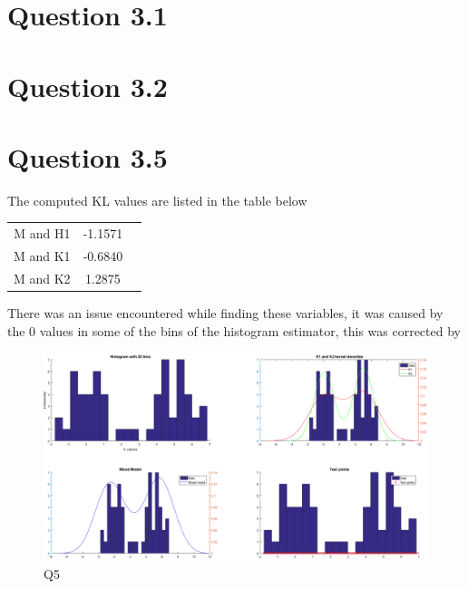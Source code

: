 \section*{Question 3.1}

\section*{Question 3.2}

\section*{Question 3.5}

The computed KL values are listed in the table below
\begin{center}
    \begin{tabular}{|c|c|c|}
        \hline
        M and H1 & -1.1571 \\
        M and K1 & -0.6840 \\
        M and K2 &  1.2875 \\
        \hline
    \end{tabular}
\end{center}

There was an issue encountered while finding these variables, it was caused by the 0 values in some of the bins of the histogram estimator, this was corrected by

\begin{figure}[H]
    \includegraphics[width=\linewidth]{../../pracs/week4/images/q5}
    \centering
    \caption{Q5}
\end{figure}


